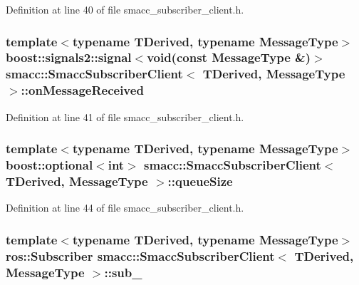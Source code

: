 Definition at line 40 of file smacc\+\_\+subscriber\+\_\+client.\+h.

\subsubsection[{\texorpdfstring{on\+Message\+Received}{onMessageReceived}}]{\setlength{\rightskip}{0pt plus 5cm}template$<$typename T\+Derived, typename Message\+Type$>$ boost\+::signals2\+::signal$<$void(const Message\+Type \&)$>$ {\bf smacc\+::\+Smacc\+Subscriber\+Client}$<$ T\+Derived, Message\+Type $>$\+::on\+Message\+Received}\hypertarget{classsmacc_1_1SmaccSubscriberClient_afa92da03ebd637e2565eee5cf226ca43}{}\label{classsmacc_1_1SmaccSubscriberClient_afa92da03ebd637e2565eee5cf226ca43}


Definition at line 41 of file smacc\+\_\+subscriber\+\_\+client.\+h.

\subsubsection[{\texorpdfstring{queue\+Size}{queueSize}}]{\setlength{\rightskip}{0pt plus 5cm}template$<$typename T\+Derived, typename Message\+Type$>$ boost\+::optional$<$int$>$ {\bf smacc\+::\+Smacc\+Subscriber\+Client}$<$ T\+Derived, Message\+Type $>$\+::queue\+Size}\hypertarget{classsmacc_1_1SmaccSubscriberClient_ac75e9d490c0383a7a686f05b2d4fcc68}{}\label{classsmacc_1_1SmaccSubscriberClient_ac75e9d490c0383a7a686f05b2d4fcc68}


Definition at line 44 of file smacc\+\_\+subscriber\+\_\+client.\+h.

\subsubsection[{\texorpdfstring{sub\+\_\+}{sub_}}]{\setlength{\rightskip}{0pt plus 5cm}template$<$typename T\+Derived, typename Message\+Type$>$ ros\+::\+Subscriber {\bf smacc\+::\+Smacc\+Subscriber\+Client}$<$ T\+Derived, Message\+Type $>$\+::sub\+\_\+\hspace{0.3cm}{\ttfamily [private]}}\hypertarget{classsmacc_1_1SmaccSubscriberClient_a1570353cc228141c8a401776e2ef31c9}{}\label{classsmacc_1_1SmaccSubscriberClient_a1570353cc228141c8a401776e2ef31c9}


